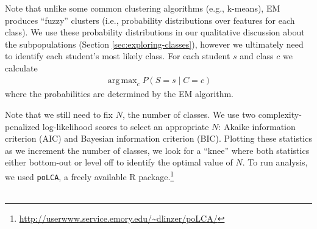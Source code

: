\documentclass{edm_template}
\DeclareMathOperator*{\argmax}{arg\,max}
\begin{document}

Note that unlike some common clustering algorithms (e.g., k-means), EM produces ``fuzzy'' clusters (i.e., probability distributions over features for each class). We use these probability distributions in our qualitative discussion about the subpopulations (Section \ref{sec:exploring-classes}), however we ultimately need to identify each student's most likely class. For each student $s$ and class $c$ we calculate
\begin{align}
\argmax_{c} P(S = s \;|\; C = c)
\label{eqn:LCA-argmax}
\end{align}
where the probabilities are determined by the EM algorithm.

Note that we still need to fix $N$, the number of classes. We use two complexity-penalized log-likelihood scores to select an appropriate $N$: Akaike information criterion (AIC) and Bayesian information criterion (BIC). Plotting these statistics as we increment the number of classes, we look for a ``knee'' where both statistics either bottom-out or level off to identify the optimal value of $N$. To run analysis, we used \texttt{poLCA}, a freely available R package.\footnote{\url{http://userwww.service.emory.edu/~dlinzer/poLCA/}}
\\\\
\end{document}
